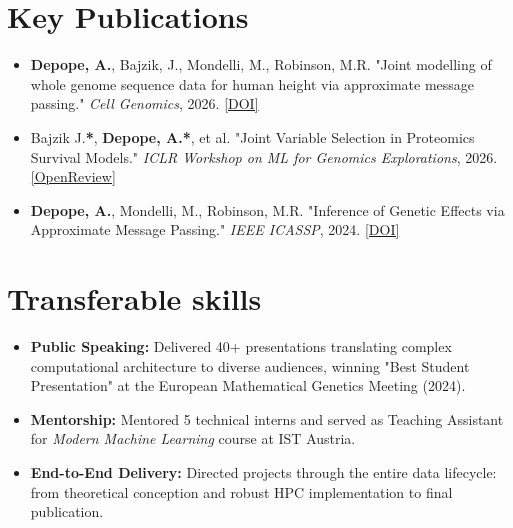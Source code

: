 \documentclass[a4paper,11pt]{article}
\begin{document}
\section{Key Publications}
\begin{itemize}[leftmargin=*, nosep, itemsep=3pt]
    \item \textbf{Depope, A.}, Bajzik, J., Mondelli, M., Robinson, M.R. "Joint modelling of whole genome sequence data for human height via approximate message passing." \textit{Cell Genomics}, 2026. \href{https://www.cell.com/cell-genomics/fulltext/S2666-979X(26)00024-8}{[DOI]}
    \item Bajzik J.\textbf{*}, \textbf{Depope, A.*}, et al. "Joint Variable Selection in Proteomics Survival Models." \textit{ICLR Workshop on ML for Genomics Explorations}, 2026. \href{https://openreview.net/forum?id=Re1rA204zd}{[OpenReview]}
    \item \textbf{Depope, A.}, Mondelli, M., Robinson, M.R. "Inference of Genetic Effects via Approximate Message Passing." \textit{IEEE ICASSP}, 2024. \href{https://doi.org/10.1109/ICASSP48485.2024.10447198}{[DOI]}
\end{itemize}

\section{Transferable skills}
\begin{itemize}[nosep, leftmargin=1.5em, itemsep=3pt, topsep=0pt]
    \item[--] \textbf{Public Speaking:} Delivered 40+ presentations translating complex computational architecture to diverse audiences, winning "Best Student Presentation" at the European Mathematical Genetics Meeting (2024).
    \item[--] \textbf{Mentorship:} Mentored 5 technical interns and served as Teaching Assistant for \textit{Modern Machine Learning} course at IST Austria.
    \item[--] \textbf{End-to-End Delivery:} Directed projects through the entire data lifecycle: from theoretical conception and robust HPC implementation to final publication.
\end{itemize}
\end{document}
